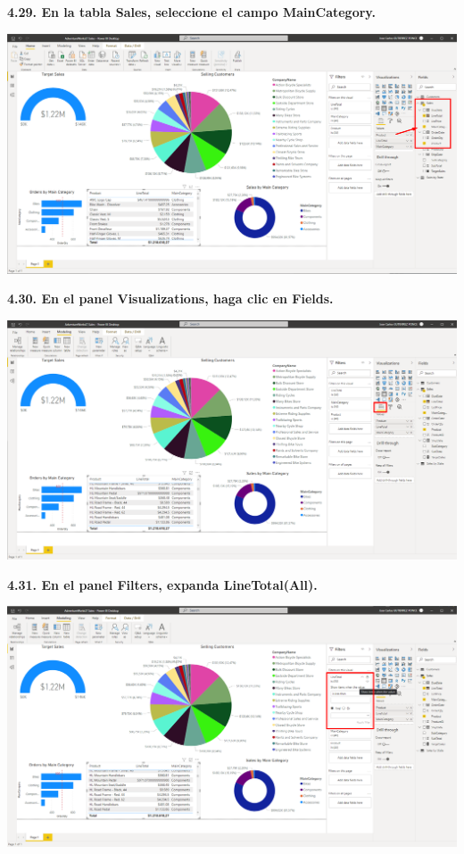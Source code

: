 \documentclass{article}
\begin{document}
\newpage
\textbf{4.29. En la tabla \textbf{Sales}, seleccione el campo \textbf{MainCategory}.}

    \begin{center}
		\includegraphics[width=14cm]{./images/105} 
	\end{center}


\textbf{4.30. En el panel \textbf{Visualizations}, haga clic en \textbf{Fields}.}

    \begin{center}
		\includegraphics[width=14cm]{./images/106} 
	\end{center}

\newpage
\textbf{4.31. En el panel \textbf{Filters}, expanda \textbf{LineTotal(All)}.}

    \begin{center}
		\includegraphics[width=14cm]{./images/107} 
	\end{center}
\end{document}
